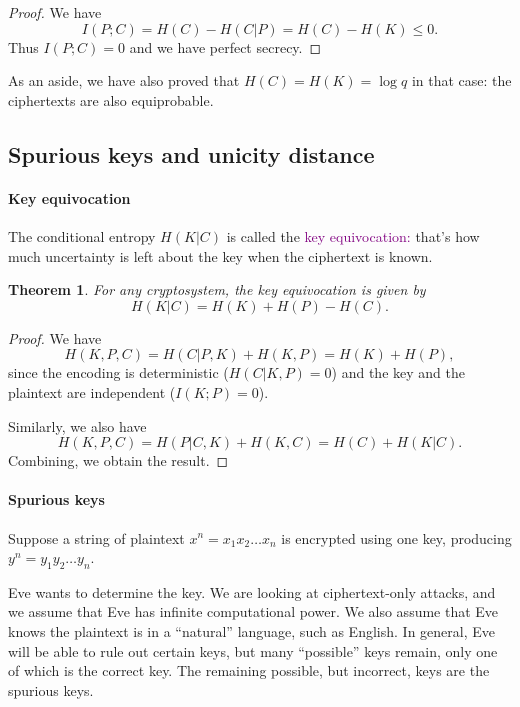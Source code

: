 \documentclass[a4paper, 11pt, openany]{book}
\numberwithin{equation}{section}
\theoremstyle{plain}
\newtheorem{theorem}	[equation]	{Theorem}
\theoremstyle{definition}
\newcommand{\Define}[1]{\textcolor{purple}{#1}}
\begin{document}
\begin{proof}
We have
\[
	I(P;C) = H(C) - H(C | P) = H(C) - H(K) \le 0.
\]
Thus $I(P;C) = 0$ and we have perfect secrecy.
\end{proof}

As an aside, we have also proved that $H(C) = H(K) = \log q$ in that case: the ciphertexts are also equiprobable.



\subsection{Spurious keys and unicity distance}


\paragraph{Key equivocation}
The conditional entropy $H(K | C)$ is called the \Define{key equivocation:} that's how much uncertainty is left about the key when the ciphertext is known.

\begin{theorem} 
For any cryptosystem, the key equivocation is given by
\[
	H(K|C) = H(K) + H(P) - H(C).
\]
\end{theorem}

\begin{proof} 
We have
\[
	H(K,P,C) = H(C | P,K) + H(K,P) = H(K) + H(P),
\]
since the encoding is deterministic ($H(C | K,P) = 0$) and the key and the plaintext are independent ($I(K;P) = 0$).

Similarly, we also have
\[
	H(K,P,C) = H(P | C, K) + H(K, C) = H(C) + H(K | C).
\]
Combining, we obtain the result.
\end{proof}


\paragraph{Spurious keys}
Suppose a string of plaintext $x^n = x_1 x_2 \dots x_n$ is encrypted using one key, producing $y^n = y_1 y_2 \dots y_n$.

Eve wants to determine the key. We are looking at ciphertext-only attacks, and we assume that Eve has infinite computational power. We also assume that Eve knows the plaintext is in a ``natural'' language, such as English. In general, Eve will be able to rule out certain keys, but many ``possible'' keys remain, only one of which is the correct key. The remaining possible, but incorrect, keys are the spurious keys.
\end{document}
